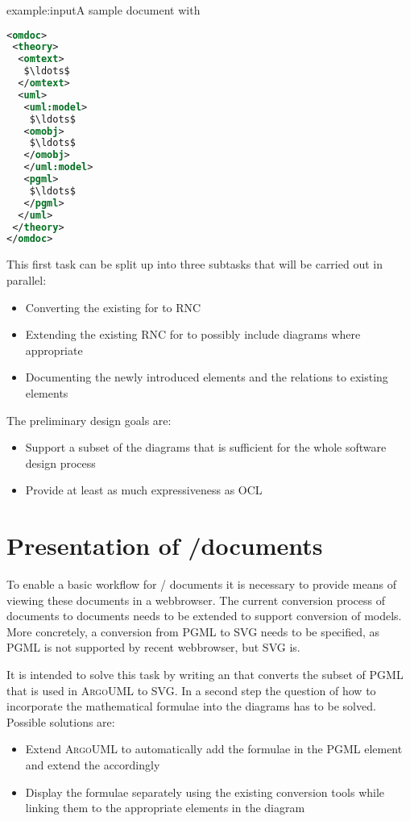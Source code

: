 \documentclass[pdftex,a4paper]{article}
\newcommand{\rnc}{\textsc{RNC}\xspace}
\newcommand{\ocl}{\textsc{OCL}\xspace}
\newcommand{\argouml}{\textsc{ArgoUML}\xspace}
\newcommand{\pgml}{\textsc{PGML}\xspace}
\newcommand{\svg}{\textsc{SVG}\xspace}
\begin{document}
\begin{myfig}{example:input}{A sample \omdoc document with \uml}
\begin{lstlisting}[language=XML,mathescape,breaklines=true]
<omdoc>
 <theory>
  <omtext>
   $\ldots$
  </omtext>
  <uml>
   <uml:model>
    $\ldots$
   <omobj>
    $\ldots$
   </omobj>
   </uml:model>
   <pgml>
    $\ldots$
   </pgml>
  </uml>
 </theory>
</omdoc>
\end{lstlisting}
\end{myfig}

This first task can be split up into three subtasks that will be carried out in parallel:
\begin{itemize}
\item Converting the existing \dtd for \xmi to \rnc
\item Extending the existing \rnc for \omdoc to possibly include \uml diagrams where
    appropriate
\item Documenting the newly introduced elements and the relations to existing \omdoc elements
\end{itemize}

The preliminary design goals are:
\begin{itemize}
\item Support a subset of the \uml diagrams that is sufficient for the whole software design
    process
\item Provide at least as much expressiveness as \ocl
\end{itemize}

\section{Presentation of \omdoc/\uml documents}
To enable a basic workflow for \omdoc / \uml documents it is necessary to provide means of viewing
these documents in a webbrowser. The current conversion process of \omdoc documents to \xhtml
documents needs to be extended to support conversion of \uml models. More concretely, a conversion
from \pgml to \svg needs to be specified, as \pgml is not supported by recent webbrowser, but \svg
is.

It is intended to solve this task by writing an \xslt that converts the subset of \pgml that is
used in \argouml to \svg. In a second step the question of how to incorporate the mathematical
formulae into the diagrams has to be solved. Possible solutions are:
\begin{itemize}
\item Extend \argouml to automatically add the formulae in the \pgml element and extend the
    \xslt accordingly
\item Display the formulae separately using the existing conversion tools while linking them to
    the appropriate elements in the \uml diagram
\end{itemize}
\end{document}
